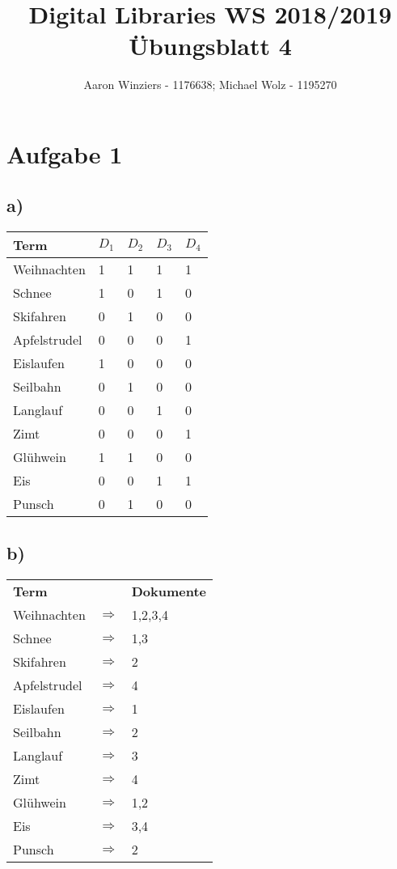 \documentclass[11pt,a4paper,parskip=half ]{scrartcl}
\author{Aaron Winziers - 1176638; Michael Wolz - 1195270}
\title{Digital Libraries WS 2018/2019\\\LARGE{Übungsblatt 4}}
\begin{document}
	\maketitle
	
	\section*{Aufgabe 1}
	
	\subsection*{a)}
	\begin{table}[H]
		\begin{tabular}{l|l|l|l|l}
			Term & $D_{1}$ & $D_{2}$ & $D_{3}$ & $D_{4}$\\ \hline
			Weihnachten		& 1 & 1 & 1 & 1     \\
			Schnee			& 1 & 0 & 1 & 0     \\
			Skifahren		& 0 & 1 & 0 & 0     \\
			Apfelstrudel	& 0 & 0 & 0 & 1     \\
			Eislaufen		& 1 & 0 & 0 & 0     \\
			Seilbahn		& 0 & 1 & 0 & 0     \\
			Langlauf		& 0 & 0 & 1 & 0     \\
			Zimt			& 0 & 0 & 0 & 1     \\
			Glühwein		& 1 & 1 & 0 & 0     \\
			Eis				& 0 & 0 & 1 & 1     \\
			Punsch			& 0 & 1 & 0 & 0     \\
		\end{tabular}
	\end{table}

	\subsection*{b)}
	\begin{table}[H]
		\begin{tabular}{lll}
			\textbf{Term} & & \textbf{Dokumente}	\\
			Weihnachten		& $\Rightarrow$ & 1,2,3,4 \\
			Schnee			& $\Rightarrow$ & 1,3 \\
			Skifahren		& $\Rightarrow$ & 2 \\
			Apfelstrudel	& $\Rightarrow$ & 4 \\
			Eislaufen		& $\Rightarrow$ & 1 \\
			Seilbahn		& $\Rightarrow$ & 2 \\
			Langlauf		& $\Rightarrow$ & 3 \\
			Zimt			& $\Rightarrow$ & 4 \\
			Glühwein		& $\Rightarrow$ & 1,2 \\
			Eis				& $\Rightarrow$ & 3,4 \\
			Punsch			& $\Rightarrow$ & 2 \\
		\end{tabular}
	\end{table}
\end{document}
